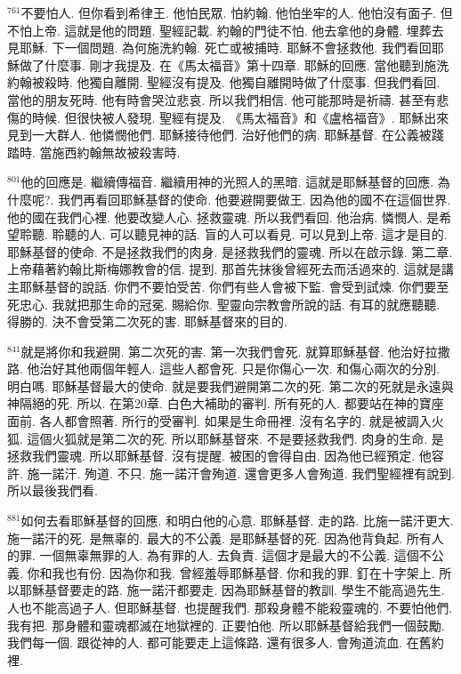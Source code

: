 \documentclass{book}
\begin{document}
$^{761}$不要怕人.
但你看到希律王.
他怕民眾.
怕約翰.
他怕坐牢的人.
他怕沒有面子.
但不怕上帝.
這就是他的問題.
聖經記載.
約翰的門徒不怕.
他去拿他的身體.
埋葬去見耶穌.
下一個問題.
為何施洗約翰.
死亡或被捕時.
耶穌不會拯救他.
我們看回耶穌做了什麼事.
剛才我提及.
在《馬太福音》第十四章.
耶穌的回應.
當他聽到施洗約翰被殺時.
他獨自離開.
聖經沒有提及.
他獨自離開時做了什麼事.
但我們看回.
當他的朋友死時.
他有時會哭泣悲哀.
所以我們相信.
他可能那時是祈禱.
甚至有悲傷的時候.
但很快被人發現.
聖經有提及.
《馬太福音》和《盧格福音》.
耶穌出來見到一大群人.
他憐憫他們.
耶穌接待他們.
治好他們的病.
耶穌基督.
在公義被踐踏時.
當施西約翰無故被殺害時.

$^{801}$他的回應是.
繼續傳福音.
繼續用神的光照人的黑暗.
這就是耶穌基督的回應.
為什麼呢?.
我們再看回耶穌基督的使命.
他要避開要做王.
因為他的國不在這個世界.
他的國在我們心裡.
他要改變人心.
拯救靈魂.
所以我們看回.
他治病.
憐憫人.
是希望聆聽.
聆聽的人.
可以聽見神的話.
盲的人可以看見.
可以見到上帝.
這才是目的.
耶穌基督的使命.
不是拯救我們的肉身.
是拯救我們的靈魂.
所以在啟示錄.
第二章.
上帝藉著約翰比斯梅娜教會的信.
提到.
那首先抹後曾經死去而活過來的.
這就是講主耶穌基督的說話.
你們不要怕受苦.
你們有些人會被下監.
會受到試煉.
你們要至死忠心.
我就把那生命的冠冕.
賜給你.
聖靈向宗教會所說的話.
有耳的就應聽聽.
得勝的.
決不會受第二次死的害.
耶穌基督來的目的.

$^{841}$就是將你和我避開.
第二次死的害.
第一次我們會死.
就算耶穌基督.
他治好拉撒路.
他治好其他兩個年輕人.
這些人都會死.
只是你傷心一次.
和傷心兩次的分別.
明白嗎.
耶穌基督最大的使命.
就是要我們避開第二次的死.
第二次的死就是永遠與神隔絕的死.
所以.
在第20章.
白色大補助的審判.
所有死的人.
都要站在神的寶座面前.
各人都會照著.
所行的受審判.
如果是生命冊裡.
沒有名字的.
就是被調入火狐.
這個火狐就是第二次的死.
所以耶穌基督來.
不是要拯救我們.
肉身的生命.
是拯救我們靈魂.
所以耶穌基督.
沒有提醒.
被困的會得自由.
因為他已經預定.
他容許.
施一諾汗.
殉道.
不只.
施一諾汗會殉道.
還會更多人會殉道.
我們聖經裡有說到.
所以最後我們看.

$^{881}$如何去看耶穌基督的回應.
和明白他的心意.
耶穌基督.
走的路.
比施一諾汗更大.
施一諾汗的死.
是無辜的.
最大的不公義.
是耶穌基督的死.
因為他背負起.
所有人的罪.
一個無辜無罪的人.
為有罪的人.
去負責.
這個才是最大的不公義.
這個不公義.
你和我也有份.
因為你和我.
曾經羞辱耶穌基督.
你和我的罪.
釘在十字架上.
所以耶穌基督要走的路.
施一諾汗都要走.
因為耶穌基督的教訓.
學生不能高過先生.
人也不能高過子人.
但耶穌基督.
也提醒我們.
那殺身體不能殺靈魂的.
不要怕他們.
我有把.
那身體和靈魂都滅在地獄裡的.
正要怕他.
所以耶穌基督給我們一個鼓勵.
我們每一個.
跟從神的人.
都可能要走上這條路.
還有很多人.
會殉道流血.
在舊約裡.
\end{document}
